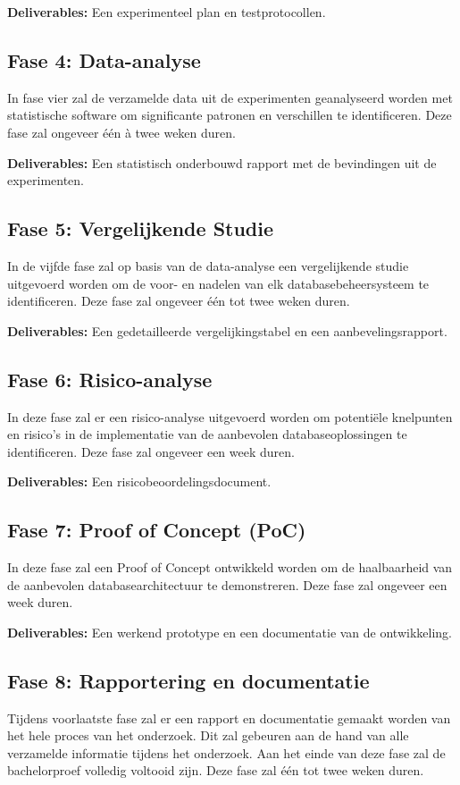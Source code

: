 \textbf{Deliverables:} Een experimenteel plan en testprotocollen.

\subsection{Fase 4: Data-analyse}
\label{subsec:dataanalyse}
In fase vier zal de verzamelde data uit de experimenten geanalyseerd worden met statistische software om significante patronen en verschillen te identificeren. Deze fase zal ongeveer één à twee weken duren.

\textbf{Deliverables:} Een statistisch onderbouwd rapport met de bevindingen uit de experimenten.

\subsection{Fase 5: Vergelijkende Studie}
\label{subsec:vergelijkendestudie}
In de vijfde fase zal op basis van de data-analyse een vergelijkende studie uitgevoerd worden om de voor- en nadelen van elk databasebeheersysteem te identificeren. Deze fase zal ongeveer één tot twee weken duren.

\textbf{Deliverables:} Een gedetailleerde vergelijkingstabel en een aanbevelingsrapport.

\subsection{Fase 6: Risico-analyse}
\label{subsec:risicoanalyse}
In deze fase zal er een risico-analyse uitgevoerd worden om potentiële knelpunten en risico's in de implementatie van de aanbevolen databaseoplossingen te identificeren. Deze fase zal ongeveer een week duren.

\textbf{Deliverables:} Een risicobeoordelingsdocument.

\subsection{Fase 7: Proof of Concept (PoC)}
\label{subsec:poc}
In deze fase zal een Proof of Concept ontwikkeld worden om de haalbaarheid van de aanbevolen databasearchitectuur te demonstreren. Deze fase zal ongeveer een week duren.

\textbf{Deliverables:} Een werkend prototype en een documentatie van de ontwikkeling.

\subsection{Fase 8: Rapportering en documentatie}
\label{subsec:rapporteringendocumentatie}
Tijdens voorlaatste fase zal er een rapport en documentatie gemaakt worden van het hele proces
van het onderzoek. Dit zal gebeuren aan de hand van alle verzamelde informatie tijdens het onderzoek. Aan het einde van deze fase zal de bachelorproef volledig voltooid zijn. Deze fase zal één tot twee weken duren.

